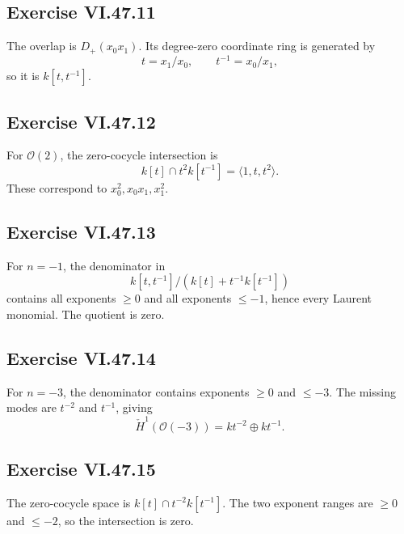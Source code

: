 \subsection*{Exercise VI.47.11}
\begin{solution}
The overlap is \(D_+(x_0x_1)\).  Its degree-zero coordinate ring is generated by
\[
t=x_1/x_0,\qquad t^{-1}=x_0/x_1,
\]
so it is \(k[t,t^{-1}]\).
\end{solution}

\subsection*{Exercise VI.47.12}
\begin{solution}
For \(\mathcal O(2)\), the zero-cocycle intersection is
\[
k[t]\cap t^2k[t^{-1}]=\langle1,t,t^2\rangle.
\]
These correspond to \(x_0^2,x_0x_1,x_1^2\).
\end{solution}

\subsection*{Exercise VI.47.13}
\begin{solution}
For \(n=-1\), the denominator in
\[
k[t,t^{-1}]/(k[t]+t^{-1}k[t^{-1}])
\]
contains all exponents \(\ge0\) and all exponents \(\le-1\), hence every Laurent monomial.  The quotient is zero.
\end{solution}

\subsection*{Exercise VI.47.14}
\begin{solution}
For \(n=-3\), the denominator contains exponents \(\ge0\) and \(\le-3\).  The missing modes are \(t^{-2}\) and \(t^{-1}\), giving
\[
\check H^1(\mathcal O(-3))=k t^{-2}\oplus k t^{-1}.
\]
\end{solution}

\subsection*{Exercise VI.47.15}
\begin{solution}
The zero-cocycle space is \(k[t]\cap t^{-2}k[t^{-1}]\).  The two exponent ranges are \(\ge0\) and \(\le-2\), so the intersection is zero.
\end{solution}

